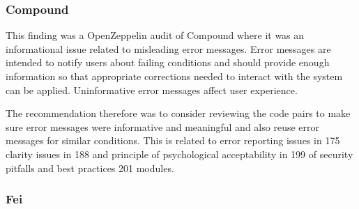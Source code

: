 \subsubsection{Compound}\label{compound}

This finding was a OpenZeppelin audit of Compound where it was an
informational issue related to misleading error messages. Error messages
are intended to notify users about failing conditions and should provide
enough information so that appropriate corrections needed to interact
with the system can be applied. Uninformative error messages affect user
experience.

The recommendation therefore was to consider reviewing the code pairs to
make sure error messages were informative and meaningful and also reuse
error messages for similar conditions. This is related to error
reporting issues in 175 clarity issues in 188 and principle of
psychological acceptability in 199 of security pitfalls and best
practices 201 modules.

\subsubsection{Fei}\label{fei}

